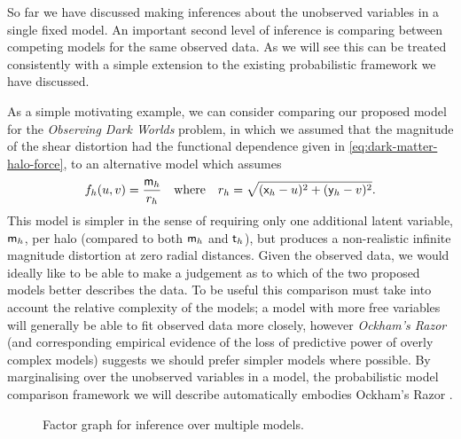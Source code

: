 So far we have discussed making inferences about the unobserved variables in a single fixed model. An important second level of inference is comparing between competing models for the same observed data. As we will see this can be treated consistently with a simple extension to the existing probabilistic framework we have discussed. 

As a simple motivating example, we can consider comparing our proposed model for the \emph{Observing Dark Worlds} problem, in which we assumed that the magnitude of the shear distortion had the functional dependence given in \eqref{eq:dark-matter-halo-force}, to an alternative model which assumes
\begin{equation}\label{eq:dark-matter-halo-force-alt-1}
  f_h(u,v) = \frac{\mathsf{m}_h}{r_h}
  \quad\textrm{where}\quad
  r_h = \sqrt{(\mathsf{x}_h - u)^2 + (\mathsf{y}_h - v)^2}.
\end{equation}
This model is simpler in the sense of requiring only one additional latent variable, $\mathsf{m}_h$, per halo (compared to both $\mathsf{m}_h$ and $\mathsf{t}_h$), but produces a non-realistic infinite magnitude distortion at zero radial distances. Given the observed data, we would ideally like to be able to make a judgement as to which of the two proposed models better describes the data. To be useful this comparison must take into account the relative complexity of the models; a model with more free variables will generally be able to fit observed data more closely, however \emph{Ockham's Razor} (and corresponding empirical evidence of the loss of predictive power of overly complex models) suggests we should prefer simpler models where possible. By marginalising over the unobserved variables in a model, the probabilistic model comparison framework we will describe automatically embodies Ockham's Razor \citep{mackay2003information}. 

\begin{figure}
\centering
{}
\caption[Model comparison factor graph.]{Factor graph for inference over multiple models.} %
\label{fig:model-comparison-factor-graph}
\end{figure}

